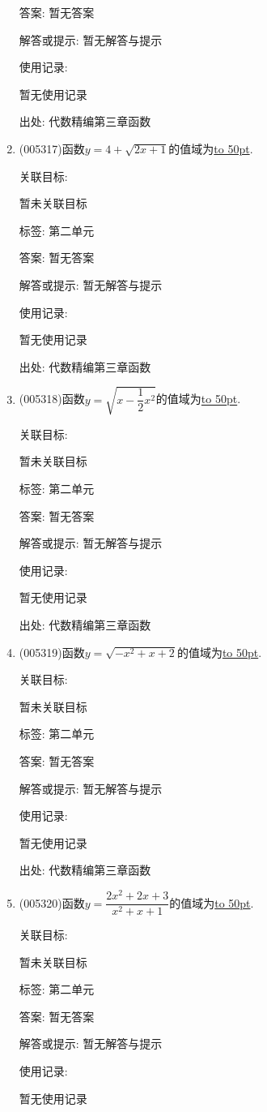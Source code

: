 \documentclass[10pt,a4paper]{article}
\newcommand{\blank}[1]{\underline{\hbox to #1pt{}}}
\begin{document}
\begin{enumerate}[1.]
答案: 暂无答案

解答或提示: 暂无解答与提示

使用记录:

暂无使用记录


出处: 代数精编第三章函数
\item { (005317)}函数$y=4+\sqrt {2x+1}$的值域为\blank{50}.


关联目标:

暂未关联目标



标签: 第二单元

答案: 暂无答案

解答或提示: 暂无解答与提示

使用记录:

暂无使用记录


出处: 代数精编第三章函数
\item { (005318)}函数$y=\sqrt {x-\dfrac 12x^2}$的值域为\blank{50}.


关联目标:

暂未关联目标



标签: 第二单元

答案: 暂无答案

解答或提示: 暂无解答与提示

使用记录:

暂无使用记录


出处: 代数精编第三章函数
\item { (005319)}函数$y=\sqrt {-x^2+x+2}$的值域为\blank{50}.


关联目标:

暂未关联目标



标签: 第二单元

答案: 暂无答案

解答或提示: 暂无解答与提示

使用记录:

暂无使用记录


出处: 代数精编第三章函数
\item { (005320)}函数$y=\dfrac{2x^2+2x+3}{x^2+x+1}$的值域为\blank{50}.


关联目标:

暂未关联目标



标签: 第二单元

答案: 暂无答案

解答或提示: 暂无解答与提示

使用记录:

暂无使用记录



\end{enumerate}
\end{document}
